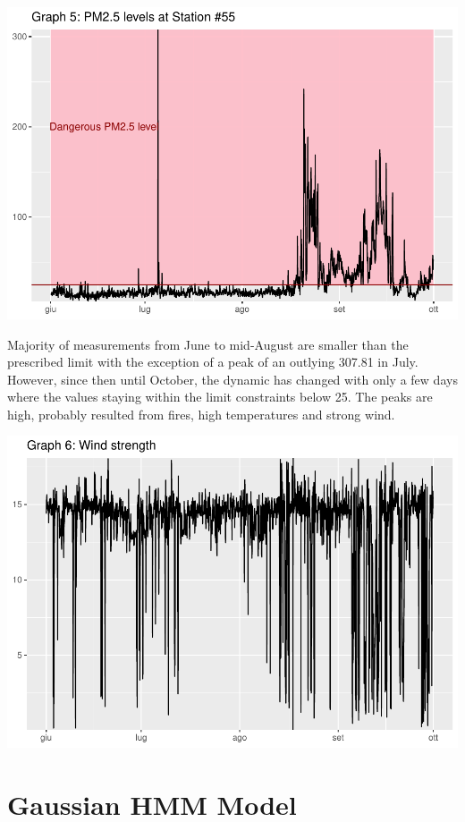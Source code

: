 \documentclass[
]{article}
\begin{document}
\begin{center}\includegraphics[width=0.75\linewidth,height=0.75\textheight]{finalproject_files/figure-latex/PM25 levels-1} \end{center}

Majority of measurements from June to mid-August are smaller than the
prescribed limit with the exception of a peak of an outlying 307.81 in
July. However, since then until October, the dynamic has changed with
only a few days where the values staying within the limit constraints
below 25. The peaks are high, probably resulted from fires, high
temperatures and strong wind.

\begin{center}\includegraphics[width=0.75\linewidth,height=0.75\textheight]{finalproject_files/figure-latex/wind levels-1} \end{center}

\hypertarget{gaussian-hmm-model}{%
\section{Gaussian HMM Model}\label{gaussian-hmm-model}}
\end{document}
